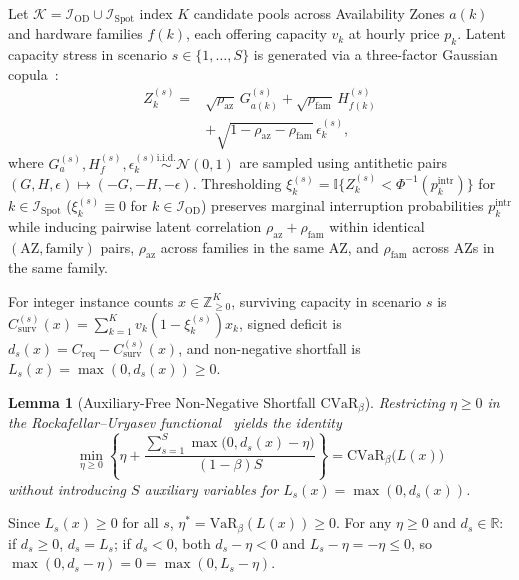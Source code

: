 \documentclass[journal]{IEEEtran}
\newtheorem{lemma}{Lemma}
\begin{document}
Let $\mathcal{K} = \mathcal{I}_{\mathrm{OD}} \cup \mathcal{I}_{\mathrm{Spot}}$ index $K$ candidate pools across Availability Zones $a(k)$ and hardware families $f(k)$, each offering capacity $v_k$ at hourly price $p_k$. Latent capacity stress in scenario $s \in \{1,\dots,S\}$ is generated via a three-factor Gaussian copula~\cite{li2000default}:
\begin{equation}
\begin{aligned}
    Z_k^{(s)} = &\sqrt{\rho_{\mathrm{az}}}\,G_{a(k)}^{(s)} + \sqrt{\rho_{\mathrm{fam}}}\,H_{f(k)}^{(s)} \\
    &+ \sqrt{1 - \rho_{\mathrm{az}} - \rho_{\mathrm{fam}}}\,\epsilon_k^{(s)},
\end{aligned}
\end{equation}
where $G_a^{(s)}, H_f^{(s)}, \epsilon_k^{(s)} \stackrel{\mathrm{i.i.d.}}{\sim} \mathcal{N}(0,1)$ are sampled using antithetic pairs $(G,H,\epsilon) \mapsto (-G,-H,-\epsilon)$. Thresholding $\xi_k^{(s)} = \mathbb{I}\{Z_k^{(s)} < \Phi^{-1}(p_k^{\mathrm{intr}})\}$ for $k \in \mathcal{I}_{\mathrm{Spot}}$ ($\xi_k^{(s)} \equiv 0$ for $k \in \mathcal{I}_{\mathrm{OD}}$) preserves marginal interruption probabilities $p_k^{\mathrm{intr}}$ while inducing pairwise latent correlation $\rho_{\mathrm{az}} + \rho_{\mathrm{fam}}$ within identical $(\text{AZ}, \text{family})$ pairs, $\rho_{\mathrm{az}}$ across families in the same AZ, and $\rho_{\mathrm{fam}}$ across AZs in the same family.

For integer instance counts $x \in \mathbb{Z}_{\ge 0}^K$, surviving capacity in scenario $s$ is $C_{\mathrm{surv}}^{(s)}(x) = \sum_{k=1}^K v_k(1 - \xi_k^{(s)})x_k$, signed deficit is $d_s(x) = C_{\mathrm{req}} - C_{\mathrm{surv}}^{(s)}(x)$, and non-negative shortfall is $L_s(x) = \max(0, d_s(x)) \ge 0$.

\begin{lemma}[Auxiliary-Free Non-Negative Shortfall $\mathrm{CVaR}_\beta$]\label{lem:cvar}
Restricting $\eta \ge 0$ in the Rockafellar--Uryasev functional~\cite{rockafellar2000optimization} yields the identity
\begin{equation}
    \min_{\eta \ge 0} \left\{ \eta + \frac{\sum_{s=1}^S \max\!\big(0, d_s(x) - \eta\big)}{(1-\beta)S} \right\} = \mathrm{CVaR}_\beta\big(L(x)\big)
\end{equation}
without introducing $S$ auxiliary variables for $L_s(x) = \max(0, d_s(x))$.
\end{lemma}
\begin{IEEEproof}
Since $L_s(x) \ge 0$ for all $s$, $\eta^* = \mathrm{VaR}_\beta(L(x)) \ge 0$. For any $\eta \ge 0$ and $d_s \in \mathbb{R}$: if $d_s \ge 0$, $d_s = L_s$; if $d_s < 0$, both $d_s - \eta < 0$ and $L_s - \eta = -\eta \le 0$, so $\max(0, d_s - \eta) = 0 = \max(0, L_s - \eta)$.
\end{IEEEproof}
\end{document}
